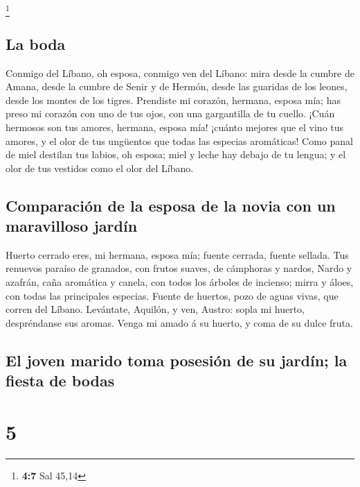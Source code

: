 \footnote{\textbf{4:7} Sal 45,14}

\hypertarget{la-boda}{%
\subsection{La boda}\label{la-boda}}

 Conmigo del Líbano, oh esposa, conmigo ven del Líbano: mira
desde la cumbre de Amana, desde la cumbre de Senir y de Hermón, desde
las guaridas de los leones, desde los montes de los tigres. 
Prendiste mi corazón, hermana, esposa mía; has preso mi corazón con uno
de tus ojos, con una gargantilla de tu cuello.  ¡Cuán
hermosos son tus amores, hermana, esposa mía! ¡cuánto mejores que el
vino tus amores, y el olor de tus ungüentos que todas las especias
aromáticas!  Como panal de miel destilan tus labios, oh
esposa; miel y leche hay debajo de tu lengua; y el olor de tus vestidos
como el olor del Líbano.

\hypertarget{comparaciuxf3n-de-la-esposa-de-la-novia-con-un-maravilloso-jarduxedn}{%
\subsection{Comparación de la esposa de la novia con un maravilloso
jardín}\label{comparaciuxf3n-de-la-esposa-de-la-novia-con-un-maravilloso-jarduxedn}}

 Huerto cerrado eres, mi hermana, esposa mía; fuente
cerrada, fuente sellada.  Tus renuevos paraíso de granados,
con frutos suaves, de cámphoras y nardos,  Nardo y azafrán,
caña aromática y canela, con todos los árboles de incienso; mirra y
áloes, con todas las principales especias.  Fuente de
huertos, pozo de aguas vivas, que corren del Líbano. 
Levántate, Aquilón, y ven, Austro: sopla mi huerto, despréndanse sus
aromas. Venga mi amado á su huerto, y coma de su dulce fruta.

\hypertarget{el-joven-marido-toma-posesiuxf3n-de-su-jarduxedn-la-fiesta-de-bodas}{%
\subsection{El joven marido toma posesión de su jardín; la fiesta de
bodas}\label{el-joven-marido-toma-posesiuxf3n-de-su-jarduxedn-la-fiesta-de-bodas}}

\hypertarget{section-4}{%
\section{5}\label{section-4}}

